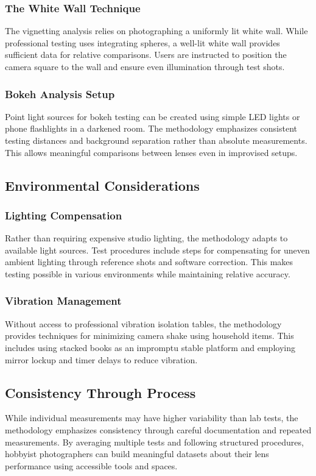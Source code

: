 \subsubsection{The White Wall Technique}
The vignetting analysis relies on photographing a uniformly lit white wall. While professional testing uses integrating spheres, a well-lit white wall provides sufficient data for relative comparisons. Users are instructed to position the camera square to the wall and ensure even illumination through test shots.

\subsubsection{Bokeh Analysis Setup} 
Point light sources for bokeh testing can be created using simple LED lights or phone flashlights in a darkened room. The methodology emphasizes consistent testing distances and background separation rather than absolute measurements. This allows meaningful comparisons between lenses even in improvised setups.

\subsection{Environmental Considerations}

\subsubsection{Lighting Compensation}
Rather than requiring expensive studio lighting, the methodology adapts to available light sources. Test procedures include steps for compensating for uneven ambient lighting through reference shots and software correction. This makes testing possible in various environments while maintaining relative accuracy.

\subsubsection{Vibration Management}
Without access to professional vibration isolation tables, the methodology provides techniques for minimizing camera shake using household items. This includes using stacked books as an impromptu stable platform and employing mirror lockup and timer delays to reduce vibration.

\subsection{Consistency Through Process}
While individual measurements may have higher variability than lab tests, the methodology emphasizes consistency through careful documentation and repeated measurements. By averaging multiple tests and following structured procedures, hobbyist photographers can build meaningful datasets about their lens performance using accessible tools and spaces.

